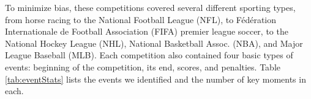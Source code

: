 \documentclass[letterpaper]{article}
\begin{document}
To minimize bias, these competitions covered several different sporting types, from horse racing to the National Football League (NFL), to F\'{e}d\'{e}ration Internationale de Football Association (FIFA) premier league soccer, to the National Hockey League (NHL), National Basketball Assoc. (NBA), and Major League Baseball (MLB). 
Each competition also contained four basic types of events: beginning of the competition, its end, scores, and penalties.
Table \ref{tab:eventStats} lists the events we identified and the number of key moments in each.
%
\end{document}
